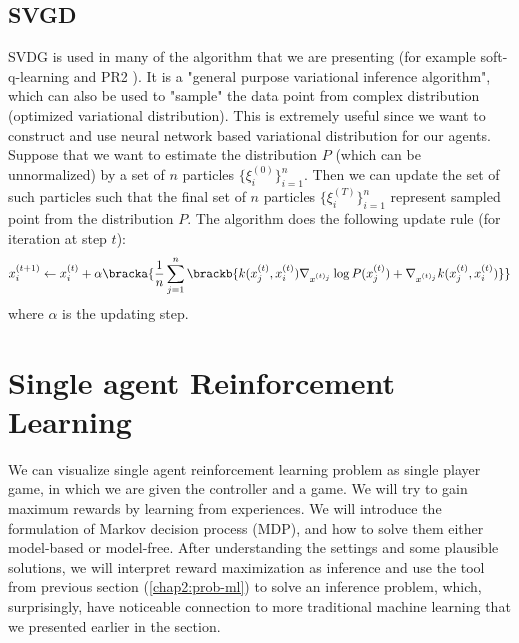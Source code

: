 \subsection{SVGD \cite{liu2016stein}}
SVDG is used in many of the algorithm that we are presenting (for example soft-q-learning \cite{haarnoja2017reinforcement} and PR2 \cite{wen2019probabilistic}). It is a "general purpose variational inference algorithm", which can also be used to "sample" the data point from complex distribution (optimized variational distribution). This is extremely useful since we want to construct and use neural network based variational distribution for our agents.  Suppose that we want to estimate the distribution $P$ (which can be unnormalized) by a set of $n$ particles $\{\xi^{(0)}_i\}^n_{i=1}$. Then we can update the set of such particles such that the final set of $n$ particles $\{\xi^{(T)}_i\}^n_{i=1}$ represent sampled point from the distribution $P$. The algorithm does the following update rule (for iteration at step $t$): 
\begin{equation}
    x^{(t+1)}_i \leftarrow x^{(t)}_i + \alpha \bracka{\frac{1}{n}\sum^n_{j=1} \brackb{k(x^{(t)}_j, x^{(t)}_i) \nabla_{x^{(t)_j}} \log P(x^{(t)}_j) + \nabla_{x^{(t)_j}} k (x^{(t)}_j, x^{(t)}_i) }}
\end{equation}
where $\alpha$ is the updating step. 

\section{Single agent Reinforcement Learning}


We can visualize single agent reinforcement learning problem as single player game, in which we are given the controller and a game. We will try to gain maximum rewards by learning from experiences. We will introduce the formulation of Markov decision process (MDP), and how to solve them either model-based or model-free. After understanding the settings and some plausible solutions, we will interpret reward maximization as inference and use the tool from previous section (\ref{chap2:prob-ml}) to solve an inference problem, which, surprisingly, have noticeable connection to more traditional machine learning that we presented earlier in the section. 


